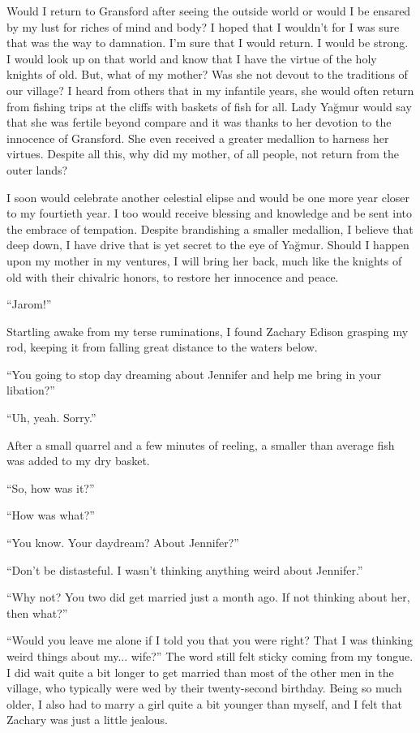 Would I return to Gransford after seeing the outside world or would I be ensared by my lust for
riches of mind and body? I hoped that I wouldn't for I was sure that was the way to damnation. I'm
sure that I would return. I would be strong. I would look up on that world and know that I have the
virtue of the holy knights of old. But, what of my mother? Was she not devout to the traditions of
our village? I heard from others that in my infantile years, she would often return from fishing
trips at the cliffs with baskets of fish for all. Lady Yağmur would say that she was fertile beyond 
compare and it was thanks to her devotion to the innocence of Gransford. She even received a greater
medallion to harness her virtues. Despite all this, why did my mother, of all people, not return
from the outer lands?

I soon would celebrate another celestial elipse and would be one more year closer to my fourtieth
year. I too would receive blessing and knowledge and be sent into the embrace of tempation. Despite
brandishing a smaller medallion, I believe that deep down, I have drive that is yet secret to the
eye of Yağmur. Should I happen upon my mother in my ventures, I will bring her back, much like the
knights of old with their chivalric honors, to restore her innocence and peace.

``Jarom!''

Startling awake from my terse ruminations, I found Zachary Edison grasping my rod, keeping it from
falling great distance to the waters below.

``You going to stop day dreaming about Jennifer and help me bring in your libation?''

``Uh, yeah. Sorry.''

After a small quarrel and a few minutes of reeling, a smaller than average fish was added to my dry
basket.

``So, how was it?''

``How was what?''

``You know. Your daydream? About Jennifer?''

``Don't be distasteful. I wasn't thinking anything weird about Jennifer.''

``Why not? You two did get married just a month ago. If not thinking about her, then what?''

``Would you leave me alone if I told you that you were right? That I was thinking weird things about
my... wife?'' The word still felt sticky coming from my tongue. I did wait quite a bit longer to get
married than most of the other men in the village, who typically were wed by their twenty-second
birthday. Being so much older, I also had to marry a girl quite a bit younger than myself, and I
felt that Zachary was just a little jealous.


